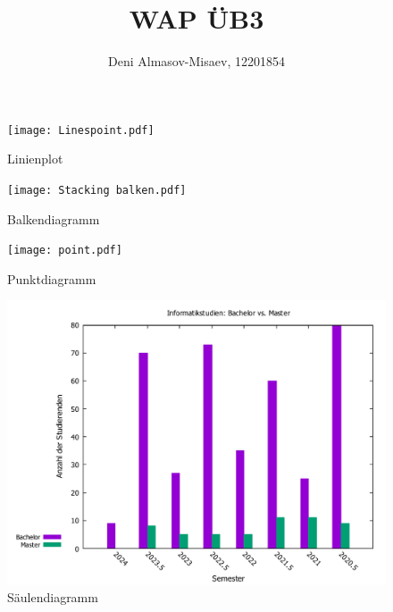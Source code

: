 \documentclass[12pt]{article}
\title{WAP ÜB3}
\author{Deni Almasov-Misaev, 12201854}
\date{} %
\begin{document}
\maketitle %

\begin{figure}[h]
    \centering
    \texttt{[image: Linespoint.pdf]} %
    \caption{Linienplot}
    \label{fig:Graph}
\end{figure}

\begin{figure}[h]
    \centering
    \texttt{[image: Stacking balken.pdf]} %
    \caption{Balkendiagramm}
    \label{fig:Graph}
\end{figure}

\begin{figure}[h]
    \centering
    \texttt{[image: point.pdf]} %
    \caption{Punktdiagramm}
    \label{fig:Graph}
\end{figure}

\begin{figure}[h]
    \centering
    \includegraphics[width=1\textwidth]{Säulen.pdf} %
    \caption{Säulendiagramm}
    \label{fig:Graph}
\end{figure}
\end{document}
